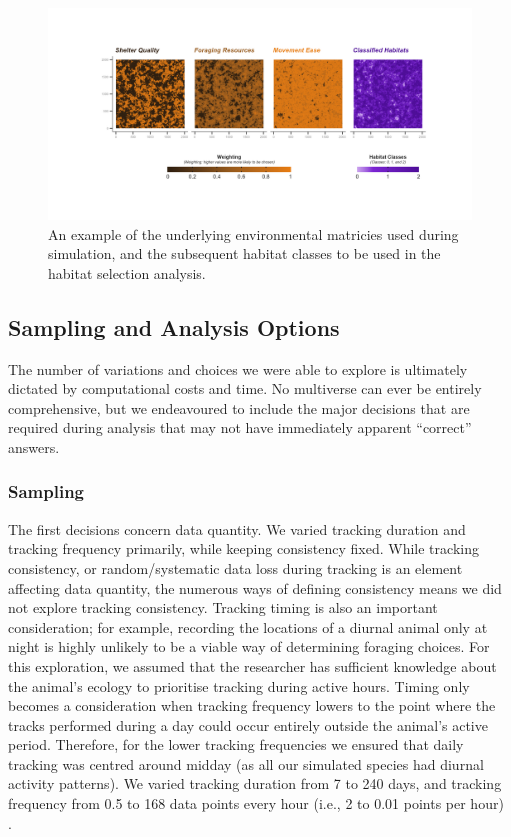 \documentclass[10pt,a4paper]{article}
\begin{document}
\begin{figure}
\includegraphics[width=1\linewidth]{../figures/landscapeExample} \caption{An example of the underlying environmental matricies used during simulation, and the subsequent habitat classes to be used in the habitat selection analysis.}\label{fig:landscapeExample}
\end{figure}

\hypertarget{sampling-and-analysis-options}{%
\subsection{Sampling and Analysis Options}\label{sampling-and-analysis-options}}

The number of variations and choices we were able to explore is ultimately dictated by computational costs and time.
No multiverse can ever be entirely comprehensive, but we endeavoured to include the major decisions that are required during analysis that may not have immediately apparent ``correct'' answers.

\hypertarget{sampling}{%
\subsubsection{Sampling}\label{sampling}}

The first decisions concern data quantity.
We varied tracking duration and tracking frequency primarily, while keeping consistency fixed.
While tracking consistency, or random/systematic data loss during tracking is an element affecting data quantity, the numerous ways of defining consistency means we did not explore tracking consistency.
Tracking timing is also an important consideration; for example, recording the locations of a diurnal animal only at night is highly unlikely to be a viable way of determining foraging choices.
For this exploration, we assumed that the researcher has sufficient knowledge about the animal's ecology to prioritise tracking during active hours.
Timing only becomes a consideration when tracking frequency lowers to the point where the tracks performed during a day could occur entirely outside the animal's active period.
Therefore, for the lower tracking frequencies we ensured that daily tracking was centred around midday (as all our simulated species had diurnal activity patterns).
We varied tracking duration from 7 to 240 days, and tracking frequency from 0.5 to 168 data points every hour (i.e., 2 to 0.01 points per hour) .
\end{document}

